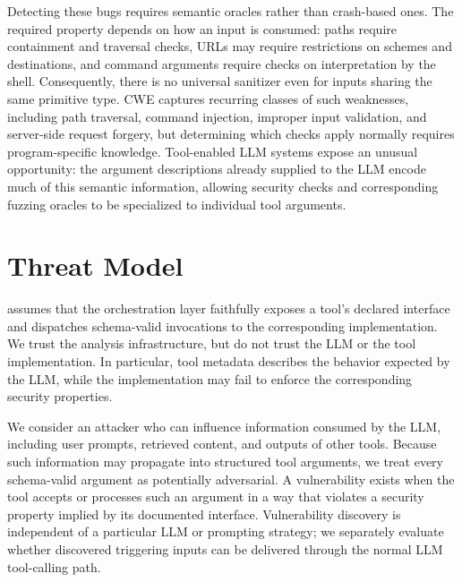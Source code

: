 Detecting these bugs requires semantic oracles rather than crash-based ones.
The required property depends on how an input is consumed: paths require
containment and traversal checks, URLs may require restrictions on schemes and
destinations, and command arguments require checks on interpretation by the
shell. Consequently, there is no universal sanitizer even for inputs sharing
the same primitive type. CWE captures recurring classes of such weaknesses,
including path traversal, command injection, improper input validation, and
server-side request forgery, but determining which checks apply normally
requires program-specific knowledge. Tool-enabled LLM systems expose an
unusual opportunity: the argument descriptions already supplied to the LLM
encode much of this semantic information, allowing security checks and
corresponding fuzzing oracles to be specialized to individual tool arguments.


\section{Threat Model}
\label{sec:threat-model}

\project{} assumes that the orchestration layer faithfully exposes a tool's
declared interface and dispatches schema-valid invocations to the corresponding
implementation. We trust the \project{} analysis infrastructure, but do not
trust the LLM or the tool implementation. In particular, tool metadata
describes the behavior expected by the LLM, while the implementation may fail
to enforce the corresponding security properties.

We consider an attacker who can influence information consumed by the LLM,
including user prompts, retrieved content, and outputs of other tools. Because
such information may propagate into structured tool arguments, we treat every
schema-valid argument as potentially adversarial. A vulnerability exists when
the tool accepts or processes such an argument in a way that violates a
security property implied by its documented interface. Vulnerability discovery
is independent of a particular LLM or prompting strategy; we separately
evaluate whether discovered triggering inputs can be delivered through the
normal LLM tool-calling path.

